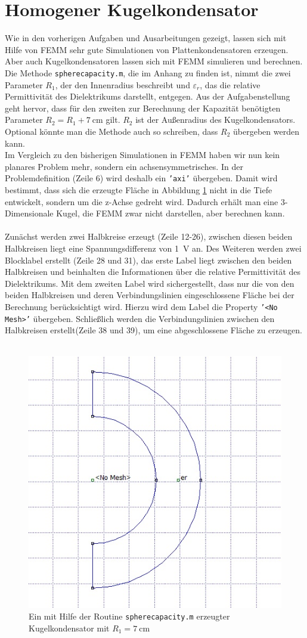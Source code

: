 \section{Homogener Kugelkondensator}
Wie in den vorherigen Aufgaben und Ausarbeitungen gezeigt, lassen sich mit Hilfe von FEMM sehr gute Simulationen von Plattenkondensatoren erzeugen. Aber auch Kugelkondensatoren lassen sich mit FEMM simulieren und berechnen. \\
Die Methode \texttt{spherecapacity.m}, die im Anhang zu finden ist, nimmt die zwei Parameter $R_1$, der den Innenradius beschreibt und $\varepsilon_r$, das die relative Permittivität des Dielektrikums darstellt, entgegen. Aus der Aufgabenstellung geht hervor, dass für den zweiten zur Berechnung der Kapazität benötigten Parameter $R_2 = R_1 + \SI{7}{\centi\meter}$ gilt. $R_2$ ist der Außenradius des Kugelkondensators. Optional könnte man die Methode auch so schreiben, dass $R_2$ übergeben werden kann.\\
Im Vergleich zu den bisherigen Simulationen in FEMM haben wir nun kein planares Problem mehr, sondern ein achsensymmetrisches. In der Problemdefinition (Zeile 6) wird deshalb ein \texttt{'axi'} übergeben. Damit wird bestimmt, dass sich die erzeugte Fläche in Abbildung \ref{fig:KK} nicht in die Tiefe entwickelt, sondern um die z-Achse gedreht wird. Dadurch erhält man eine 3-Dimensionale Kugel, die FEMM zwar nicht darstellen, aber berechnen kann.\\ \\
Zunächst werden zwei Halbkreise erzeugt (Zeile 12-26), zwischen diesen beiden Halbkreisen liegt eine Spannungsdifferenz von \SI{1}{\volt} an. Des Weiteren werden zwei Blocklabel erstellt (Zeile 28 und 31), das erste Label liegt zwischen den beiden Halbkreisen und beinhalten die Informationen über die relative Permittivität des Dielektrikums. Mit dem zweiten Label wird sichergestellt, dass nur die von den beiden Halbkreisen und deren Verbindungslinien eingeschlossene Fläche bei der Berechnung berücksichtigt wird. Hierzu wird dem Label die Property \texttt{'<No Mesh>'} übergeben. Schließlich werden die Verbindungslinien zwischen den Halbkreisen erstellt(Zeile 38 und 39), um eine abgeschlossene Fläche zu erzeugen. \\ \\
\begin{figure}[h]
	\centering
	\includegraphics[width=.45\textwidth]{data/Kugelkondensator}
	\caption{Ein mit Hilfe der Routine \texttt{spherecapacity.m} erzeugter Kugelkondensator mit $R_1 = \SI{7}{\centi\meter}$ }
	\label{fig:KK}
\end{figure}

